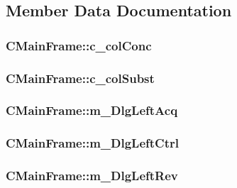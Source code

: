 \subsection{Member Data Documentation}
\hypertarget{classCMainFrame_ae4d768fcb7c1899492e1bf580288cf00}{
\subsubsection[{c\_\-colConc}]{ {\bf CMainFrame::c\_\-colConc}}}
\label{classCMainFrame_ae4d768fcb7c1899492e1bf580288cf00}
\hypertarget{classCMainFrame_ac3f899e2be2db6cd9831920789448799}{
\subsubsection[{c\_\-colSubst}]{ {\bf CMainFrame::c\_\-colSubst}}}
\label{classCMainFrame_ac3f899e2be2db6cd9831920789448799}
\hypertarget{classCMainFrame_a4f072ce2952caf08ac3bfa7d95615eeb}{
\subsubsection[{m\_\-DlgLeftAcq}]{ {\bf CMainFrame::m\_\-DlgLeftAcq}}}
\label{classCMainFrame_a4f072ce2952caf08ac3bfa7d95615eeb}
\hypertarget{classCMainFrame_a8579281ed025c8a7c6aaa06aa4a41c2a}{
\subsubsection[{m\_\-DlgLeftCtrl}]{ {\bf CMainFrame::m\_\-DlgLeftCtrl}}}
\label{classCMainFrame_a8579281ed025c8a7c6aaa06aa4a41c2a}
\hypertarget{classCMainFrame_ae0e57c519c845b8d52e03f899253ff84}{
\subsubsection[{m\_\-DlgLeftRev}]{ {\bf CMainFrame::m\_\-DlgLeftRev}}}
